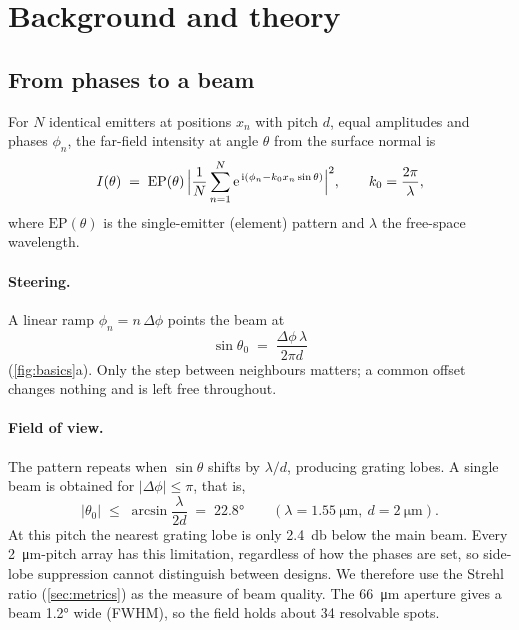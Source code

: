 \section{Background and theory}
\label{sec:background}

\subsection{From phases to a beam}
\label{sec:arraytheory}

For $N$ identical emitters at positions $x_n$ with pitch $d$, equal amplitudes and phases $\phi_n$, the far-field
intensity at angle $\theta$ from the surface normal is
\begin{equation}
  I(\theta) \;=\; \mathrm{EP}(\theta)\,\Bigl|\frac{1}{N}\sum_{n=1}^{N} \mathrm{e}^{\,\mathrm{i}(\phi_n - k_0 x_n \sin\theta)}\Bigr|^{2},
  \qquad k_0=\frac{2\pi}{\lambda},
  \label{eq:farfield}
\end{equation}
where $\mathrm{EP}(\theta)$ is the single-emitter (element) pattern and $\lambda$ the free-space wavelength.

\paragraph{Steering.} A linear ramp $\phi_n=n\,\Delta\phi$ points the beam at
\begin{equation}
  \sin\theta_0 \;=\; \frac{\Delta\phi\,\lambda}{2\pi d}
  \label{eq:steer}
\end{equation}
(\cref{fig:basics}a). Only the step between neighbours matters; a common offset changes nothing and is left free
throughout.

\paragraph{Field of view.} The pattern repeats when $\sin\theta$ shifts by $\lambda/d$, producing grating lobes. A
single beam is obtained for $|\Delta\phi|\le\pi$, that is,
\begin{equation}
  |\theta_0| \;\le\; \arcsin\frac{\lambda}{2d} \;=\; \ang{22.8}
  \qquad(\lambda=\qty{1.55}{\micro\metre},\ d=\qty{2}{\micro\metre}).
  \label{eq:fov}
\end{equation}
At this pitch the nearest grating lobe is only \qty{2.4}{\decibel} below the main beam. Every
\qty{2}{\micro\metre}-pitch array has this limitation, regardless of how the phases are set, so side-lobe
suppression cannot distinguish between designs. We therefore use the Strehl ratio (\cref{sec:metrics}) as the
measure of beam quality. The \qty{66}{\micro\metre} aperture gives a beam \ang{1.2} wide (FWHM), so the field holds
about \num{34} resolvable spots.

